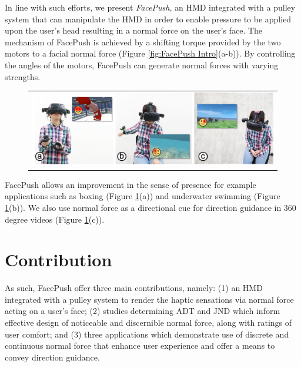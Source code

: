 In line with such efforts, we present \textit{FacePush}, an HMD integrated with a pulley system that can manipulate the HMD in order to enable pressure to be applied upon the user's head resulting in a normal force on the user's face. The mechanism of FacePush is achieved by a shifting torque provided by the two motors to a facial normal force (Figure \ref{fig:FacePush Intro}(a-b)). By controlling the angles of the motors, FacePush can generate normal forces with varying strengths. 

\begin{figure}[hp]
    \begin{center}
        \begin{tabular}{@{\hspace{0.1cm}}c}
           \includegraphics[width=1\textwidth]{figures/3Applications.png}
        \end{tabular}
        \label{fig:3Applicaions Intro}
    \end{center}
\end{figure}

FacePush allows an improvement in the sense of presence for example applications such as boxing (Figure \ref{fig:3Applicaions Intro}(a)) and underwater swimming (Figure \ref{fig:3Applicaions Intro}(b)). We also use normal force as a directional cue for direction guidance in 360 degree videos (Figure  \ref{fig:3Applicaions Intro}(c)).



\section{Contribution }

As such, FacePush offer three main contributions, namely: (1) an HMD integrated with a pulley system to render the haptic sensations via normal force acting on a user's face; (2) studies determining ADT and JND which inform effective design of noticeable and discernible normal force, along with ratings of user comfort; and (3) three applications which demonstrate use of discrete and continuous normal force that enhance user experience and offer a means to convey direction guidance.